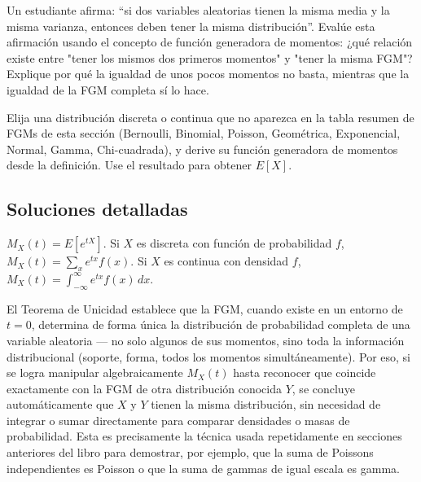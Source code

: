 \begin{problema}
	\label{prob:5098ae4}
	Un estudiante afirma: ``si dos variables aleatorias tienen la misma media y la misma varianza, entonces deben tener la misma distribución''. Evalúe esta afirmación usando el concepto de función generadora de momentos: ¿qué relación existe entre "tener los mismos dos primeros momentos" y "tener la misma FGM"? Explique por qué la igualdad de unos pocos momentos no basta, mientras que la igualdad de la FGM completa sí lo hace.
\end{problema}

\begin{problema}
	\label{prob:a48cc99}
	Elija una distribución discreta o continua que no aparezca en la tabla resumen de FGMs de esta sección (Bernoulli, Binomial, Poisson, Geométrica, Exponencial, Normal, Gamma, Chi-cuadrada), y derive su función generadora de momentos desde la definición. Use el resultado para obtener $E[X]$.
\end{problema}

\subsection*{Soluciones detalladas}

\begin{solproblema}[prob:5a5f63a]
	$M_X(t) = E[e^{tX}]$. Si $X$ es discreta con función de probabilidad $f$, $M_X(t) = \sum_x e^{tx}f(x)$. Si $X$ es continua con densidad $f$, $M_X(t) = \int_{-\infty}^{\infty} e^{tx}f(x)\,dx$.
\end{solproblema}

\begin{solproblema}[prob:f26d9b0]
	El Teorema de Unicidad establece que la FGM, cuando existe en un entorno de $t=0$, determina de forma única la distribución de probabilidad completa de una variable aleatoria — no solo algunos de sus momentos, sino toda la información distribucional (soporte, forma, todos los momentos simultáneamente). Por eso, si se logra manipular algebraicamente $M_{X}(t)$ hasta reconocer que coincide exactamente con la FGM de otra distribución conocida $Y$, se concluye automáticamente que $X$ y $Y$ tienen la misma distribución, sin necesidad de integrar o sumar directamente para comparar densidades o masas de probabilidad. Esta es precisamente la técnica usada repetidamente en secciones anteriores del libro para demostrar, por ejemplo, que la suma de Poissons independientes es Poisson o que la suma de gammas de igual escala es gamma.
\end{solproblema}


